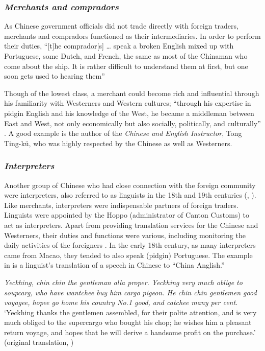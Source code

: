 \documentclass[output=paper]{langsci/langscibook}
\begin{document}
\subsubsection{\textit{Merchants and compradors}}

As Chinese government officials did not trade directly with foreign traders, merchants and compradors functioned as their intermediaries. In order to perform their duties, “[t]he comprador[s] … speak a broken English mixed up with Portuguese, some Dutch, and French, the same as most of the Chinaman who come about the ship. It is rather difficult to understand them at first, but one soon gets used to hearing them”\citep[29]{tyng_before_1999}

Though of the lowest class, a merchant could become rich and influential through his familiarity with Westerners and Western cultures; “through his expertise in pidgin English and his knowledge of the West, he became a middleman between East and West, not only economically but also socially, politically, and culturally” \citep[180]{thao_du_1970}. A good example is the author of the \textit{Chinese and English Instructor}, Tong Ting-kü, who was highly respected by the Chinese as well as Westerners.

\subsubsection{\textit{Interpreters}}

Another group of Chinese who had close connection with the foreign community were interpreters, also referred to as linguists in the 18th and 19th centuries (\citealt[50]{hunter_fan_1882}, \citealt{van_dyke_canton_2005}). Like merchants, interpreters were indispensable partners of foreign traders. Linguists were appointed by the Hoppo (administrator of Canton Customs) to act as interpreters. Apart from providing translation services for the Chinese and Westerners, their duties and functions were various, including monitoring the daily activities of the foreigners \citep{barreto_interpreters_2016}. In the early 18th century, as many interpreters came from Macao, they tended to also speak (pidgin) Portuguese. The example in  is a linguist’s translation of a speech in Chinese to “China Anglish.” 

\ea \label{ex:7:3}
    \textit{Yeckhing, chin chin the gentleman alla proper. Yeckhing very much oblige to soupcarg, who have wantchee buy him cargo pigeon. He chin chin gentlemen good voyagee, hopee go home his country No.1 good, and catchee many per cent.}\\
    \glt ‘Yeckhing thanks the gentlemen assembled, for their polite attention, and is very much obliged to the supercargo who bought his chop; he wishes him a pleasant return voyage, and hopes that he will derive a handsome profit on the purchase.’ (original translation, \citealt[126]{tiffany_canton_1849})
\z
\end{document}
